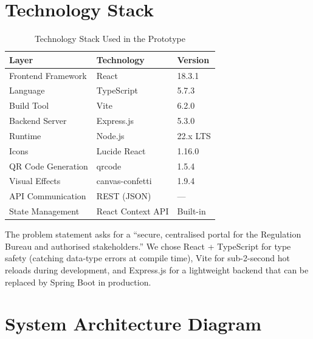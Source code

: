 \documentclass[12pt, a4paper]{report}
\begin{document}
\section{Technology Stack}

\begin{table}[H]
\centering
\caption{Technology Stack Used in the Prototype}
\label{tab:techstack}
\begin{tabular}{lll}
\toprule
\textbf{Layer} & \textbf{Technology} & \textbf{Version} \\
\midrule
Frontend Framework & React & 18.3.1 \\
Language & TypeScript & 5.7.3 \\
Build Tool & Vite & 6.2.0 \\
Backend Server & Express.js & 5.3.0 \\
Runtime & Node.js & 22.x LTS \\
Icons & Lucide React & 1.16.0 \\
QR Code Generation & qrcode & 1.5.4 \\
Visual Effects & canvas-confetti & 1.9.4 \\
API Communication & REST (JSON) & --- \\
State Management & React Context API & Built-in \\
\bottomrule
\end{tabular}
\end{table}

\begin{connectionbox}
The problem statement asks for a ``secure, centralised portal for the Regulation Bureau and authorised stakeholders.'' We chose React + TypeScript for type safety (catching data-type errors at compile time), Vite for sub-2-second hot reloads during development, and Express.js for a lightweight backend that can be replaced by Spring Boot in production.
\end{connectionbox}

\section{System Architecture Diagram}
\end{document}
